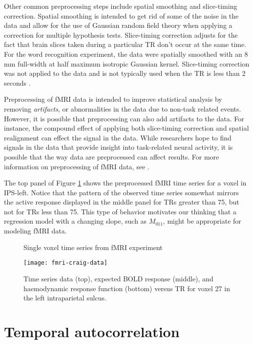 Other common preprocessing steps include spatial smoothing and slice-timing correction. Spatial smoothing is intended to get rid of some of the noise in the data and allow for the use of Gaussian random field theory when applying a correction for multiple hypothesis tests. Slice-timing correction adjusts for the fact that brain slices taken during a particular TR don't occur at the same time. For the word recognition experiment, the data were spatially smoothed with an 8 mm full-width at half maximum isotropic Gaussian kernel. Slice-timing correction was not applied to the data and is not typically used when the TR is less than 2 seconds \citep{penny:spm:2011}.

Preprocessing of fMRI data is intended to improve statistical analysis by removing \emph{artifacts}, or abnormalities in the data due to non-task related events. However, it is possible that preprocessing can also add artifacts to the data. For instance, the compound effect of applying both slice-timing correction and spatial realignment can effect the signal in the data. While researchers hope to find signals in the data that provide insight into task-related neural activity, it is possible that the way data are preprocessed can affect results. For more information on preprocessing of fMRI data, see \citet[Chapter 4,][]{ashby:fmri:2011}.

The top panel of Figure \ref{fig:fmri:data} shows the preprocessed fMRI time series for a voxel in IPS-left. Notice that the pattern of the observed time series somewhat mirrors the active response displayed in the middle panel for TRs greater than 75, but not for TRs less than 75. This type of behavior motivates our thinking that a regression model with a changing slope, such as $M_{011}$, might be appropriate for modeling fMRI data.

\begin{figure}
\ssp
\centering
\caption{Single voxel time series from fMRI experiment} \label{fig:fmri:data}
\texttt{[image: fmri-craig-data]}
\caption*{Time series data (top), expected BOLD response (middle), and haemodynamic response function (bottom) versus TR for voxel 27 in the left intraparietal sulcus.}
\end{figure}

\section{Temporal autocorrelation \label{sec:fmri:cor}}

